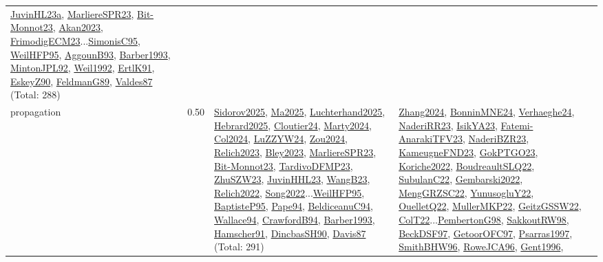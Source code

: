 {\begin{longtable}{p{3cm}r>{\raggedright\arraybackslash}p{6cm}>{\raggedright\arraybackslash}p{6cm}>{\raggedright\arraybackslash}p{8cm}}
\hyperref[detail:JuvinHL23a]{JuvinHL23a}, \hyperref[detail:MarliereSPR23]{MarliereSPR23}, \hyperref[detail:Bit-Monnot23]{Bit-Monnot23}, \hyperref[detail:Akan2023]{Akan2023}, \hyperref[detail:FrimodigECM23]{FrimodigECM23}...\hyperref[detail:SimonisC95]{SimonisC95}, \hyperref[detail:WeilHFP95]{WeilHFP95}, \hyperref[detail:AggounB93]{AggounB93}, \hyperref[detail:Barber1993]{Barber1993}, \hyperref[detail:MintonJPL92]{MintonJPL92}, \hyperref[detail:Weil1992]{Weil1992}, \hyperref[detail:ErtlK91]{ErtlK91}, \hyperref[detail:EskeyZ90]{EskeyZ90}, \hyperref[detail:FeldmanG89]{FeldmanG89}, \hyperref[detail:Valdes87]{Valdes87} (Total: 288)\\
\index{propagation}\index{CP!propagation}propagation &  0.50 & \hyperref[detail:Sidorov2025]{Sidorov2025}, \hyperref[detail:Ma2025]{Ma2025}, \hyperref[detail:Luchterhand2025]{Luchterhand2025}, \hyperref[detail:Hebrard2025]{Hebrard2025}, \hyperref[detail:Cloutier24]{Cloutier24}, \hyperref[detail:Marty2024]{Marty2024}, \hyperref[detail:Col2024]{Col2024}, \hyperref[detail:LuZZYW24]{LuZZYW24}, \hyperref[detail:Zou2024]{Zou2024}, \hyperref[detail:Relich2023]{Relich2023}, \hyperref[detail:Bley2023]{Bley2023}, \hyperref[detail:MarliereSPR23]{MarliereSPR23}, \hyperref[detail:Bit-Monnot23]{Bit-Monnot23}, \hyperref[detail:TardivoDFMP23]{TardivoDFMP23}, \hyperref[detail:ZhuSZW23]{ZhuSZW23}, \hyperref[detail:JuvinHHL23]{JuvinHHL23}, \hyperref[detail:WangB23]{WangB23}, \hyperref[detail:Relich2022]{Relich2022}, \hyperref[detail:Song2022]{Song2022}...\hyperref[detail:WeilHFP95]{WeilHFP95}, \hyperref[detail:BaptisteP95]{BaptisteP95}, \hyperref[detail:Pape94]{Pape94}, \hyperref[detail:BeldiceanuC94]{BeldiceanuC94}, \hyperref[detail:Wallace94]{Wallace94}, \hyperref[detail:CrawfordB94]{CrawfordB94}, \hyperref[detail:Barber1993]{Barber1993}, \hyperref[detail:Hamscher91]{Hamscher91}, \hyperref[detail:DincbasSH90]{DincbasSH90}, \hyperref[detail:Davis87]{Davis87} (Total: 291) & \hyperref[detail:Zhang2024]{Zhang2024}, \hyperref[detail:BonninMNE24]{BonninMNE24}, \hyperref[detail:Verhaeghe24]{Verhaeghe24}, \hyperref[detail:NaderiRR23]{NaderiRR23}, \hyperref[detail:IsikYA23]{IsikYA23}, \hyperref[detail:Fatemi-AnarakiTFV23]{Fatemi-AnarakiTFV23}, \hyperref[detail:NaderiBZR23]{NaderiBZR23}, \hyperref[detail:KameugneFND23]{KameugneFND23}, \hyperref[detail:GokPTGO23]{GokPTGO23}, \hyperref[detail:Koriche2022]{Koriche2022}, \hyperref[detail:BoudreaultSLQ22]{BoudreaultSLQ22}, \hyperref[detail:SubulanC22]{SubulanC22}, \hyperref[detail:Gembarski2022]{Gembarski2022}, \hyperref[detail:MengGRZSC22]{MengGRZSC22}, \hyperref[detail:YunusogluY22]{YunusogluY22}, \hyperref[detail:OuelletQ22]{OuelletQ22}, \hyperref[detail:MullerMKP22]{MullerMKP22}, \hyperref[detail:GeitzGSSW22]{GeitzGSSW22}, \hyperref[detail:ColT22]{ColT22}...\hyperref[detail:PembertonG98]{PembertonG98}, \hyperref[detail:SakkoutRW98]{SakkoutRW98}, \hyperref[detail:BeckDSF97]{BeckDSF97}, \hyperref[detail:GetoorOFC97]{GetoorOFC97}, \hyperref[detail:Psarras1997]{Psarras1997}, \hyperref[detail:SmithBHW96]{SmithBHW96}, \hyperref[detail:RoweJCA96]{RoweJCA96}, \hyperref[detail:Gent1996]{Gent1996}, 
\end{longtable}}
